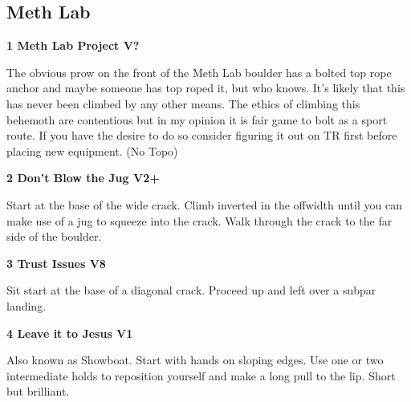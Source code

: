 	\begin{multicols}{2}


\needspace{1.5cm}
\subsection*{Meth Lab}\label{bf:Meth Lab}
	


\needspace{1.5cm}
\label{rt:Meth Lab Project}
\colorbox{black!20}{
\parbox{0.95\linewidth}{
\textbf{
1 Meth Lab Project V?  \warn\warn\warn
}}}

\begin{adjustwidth}{0.5cm}{}			
The obvious prow on the front of the Meth Lab boulder has a bolted top rope anchor and maybe someone has top roped it, but who knows. It's likely that this has never been climbed by any other means. The ethics of climbing this behemoth are contentious but in my opinion it is fair game to bolt as a sport route. If you have the desire to do so consider figuring it out on TR first before placing new equipment. (No Topo)
\end{adjustwidth}



\needspace{1.5cm}
\label{rt:Don't Blow the Jug}
\colorbox{green!20}{
\parbox{0.95\linewidth}{
\textbf{
2 Don't Blow the Jug V2+  \warn
}}}

\begin{adjustwidth}{0.5cm}{}			
Start at the base of the wide crack. Climb inverted in the offwidth until you can make use of a jug to squeeze into the crack. Walk through the crack to the far side of the boulder.
\end{adjustwidth}



\needspace{1.5cm}
\label{rt:Trust Issues}
\colorbox{Goldenrod!50}{
\parbox{0.95\linewidth}{
\textbf{
3 Trust Issues V8  \warn\warn
}}}

\begin{adjustwidth}{0.5cm}{}			
Sit start at the base of a diagonal crack. Proceed up and left over a subpar landing.
\end{adjustwidth}



\needspace{1.5cm}
\label{rt:Leave it to Jesus}
\colorbox{green!20}{
\parbox{0.95\linewidth}{
\textbf{
4 Leave it to Jesus V1  
}}}

\begin{adjustwidth}{0.5cm}{}			
Also known as Showboat. Start with hands on sloping edges. Use one or two intermediate holds to reposition yourself and make a long pull to the lip. Short but brilliant.
\end{adjustwidth}


\end{multicols}
